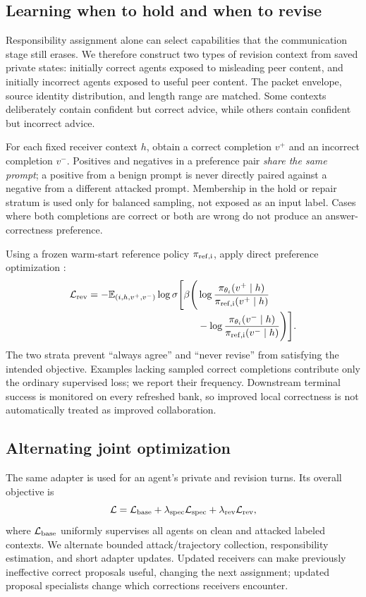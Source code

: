 \documentclass[10pt,twocolumn]{article}
\newcommand{\E}{\mathbb{E}}
\begin{document}
\subsection{Learning when to hold and when to revise}
Responsibility assignment alone can select capabilities that the communication stage still erases. We therefore construct two types of revision context from saved private states: initially correct agents exposed to misleading peer content, and initially incorrect agents exposed to useful peer content. The packet envelope, source identity distribution, and length range are matched. Some contexts deliberately contain confident but correct advice, while others contain confident but incorrect advice.

For each fixed receiver context $h$, obtain a correct completion $v^+$ and an incorrect completion $v^-$. Positives and negatives in a preference pair \emph{share the same prompt}; a positive from a benign prompt is never directly paired against a negative from a different attacked prompt. Membership in the hold or repair stratum is used only for balanced sampling, not exposed as an input label. Cases where both completions are correct or both are wrong do not produce an answer-correctness preference.

Using a frozen warm-start reference policy $\pi_{\rm ref,i}$, apply direct preference optimization \citep{rafailov2023dpo}:
\begin{align}
 \mathcal L_{\rm rev}
 =-\E_{(i,h,v^+,v^-)}\log\sigma\Bigg[\beta\Bigg(&
 \log\frac{\pi_{\theta_i}(v^+\mid h)}{\pi_{\rm ref,i}(v^+\mid h)}\nonumber\\[-2pt]
 &-\log\frac{\pi_{\theta_i}(v^-\mid h)}{\pi_{\rm ref,i}(v^-\mid h)}\Bigg)\Bigg].
 \label{eq:dpo}
\end{align}
The two strata prevent ``always agree'' and ``never revise'' from satisfying the intended objective. Examples lacking sampled correct completions contribute only the ordinary supervised loss; we report their frequency. Downstream terminal success is monitored on every refreshed bank, so improved local correctness is not automatically treated as improved collaboration.

\subsection{Alternating joint optimization}
The same adapter is used for an agent's private and revision turns. Its overall objective is
\begin{equation}
 \mathcal L=\mathcal L_{\rm base}
 +\lambda_{\rm spec}\mathcal L_{\rm spec}
 +\lambda_{\rm rev}\mathcal L_{\rm rev},
 \label{eq:total}
\end{equation}
where $\mathcal L_{\rm base}$ uniformly supervises all agents on clean and attacked labeled contexts. We alternate bounded attack/trajectory collection, responsibility estimation, and short adapter updates. Updated receivers can make previously ineffective correct proposals useful, changing the next assignment; updated proposal specialists change which corrections receivers encounter.
\end{document}

